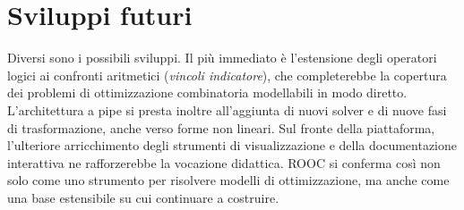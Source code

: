 \section{Sviluppi futuri}
\label{sec:sviluppi-futuri}

Diversi sono i possibili sviluppi. Il più immediato è l'estensione degli
operatori logici ai confronti aritmetici (\emph{vincoli indicatore}), che
completerebbe la copertura dei problemi di ottimizzazione combinatoria
modellabili in modo diretto. L'architettura a pipe si presta inoltre
all'aggiunta di nuovi solver e di nuove fasi di trasformazione, anche verso
forme non lineari. Sul fronte della piattaforma, l'ulteriore arricchimento degli
strumenti di visualizzazione e della documentazione interattiva ne rafforzerebbe
la vocazione didattica. ROOC si conferma così non solo come uno strumento per
risolvere modelli di ottimizzazione, ma anche come una base estensibile su cui
continuare a costruire.
